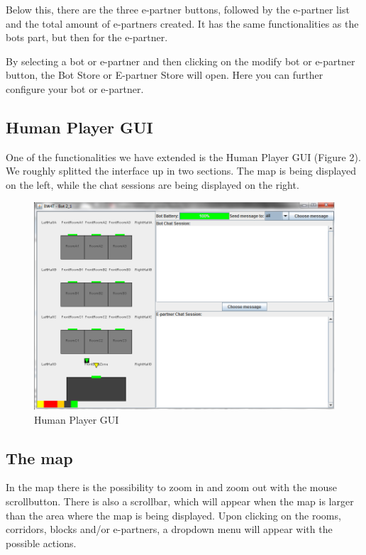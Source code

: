 \documentclass{article}
\begin{document}
Below this, there are the three e-partner buttons, followed by the e-partner list and the total amount of e-partners created. It has the same functionalities as the bots part, but then for the e-partner.

By selecting a bot or e-partner and then clicking on the modify bot or e-partner button, the Bot Store or E-partner Store will open. Here you can further configure your bot or e-partner.

\subsection{Human Player GUI}

One of the functionalities we have extended is the Human Player GUI (Figure 2). We roughly splitted the interface up in two sections. The map is being displayed on the left, while the chat sessions are being displayed on the right.

\begin{figure}[h]
\includegraphics[width=\textwidth]{hpg.png}
\caption{Human Player GUI}
\end{figure}

\subsection{The map}
In the map there is the possibility to zoom in and zoom out with the mouse scrollbutton. There is also a scrollbar, which will appear when the map is larger than the area where the map is being displayed. Upon clicking on the rooms, corridors, blocks and/or e-partners, a dropdown menu will appear with the possible actions.
\end{document}
